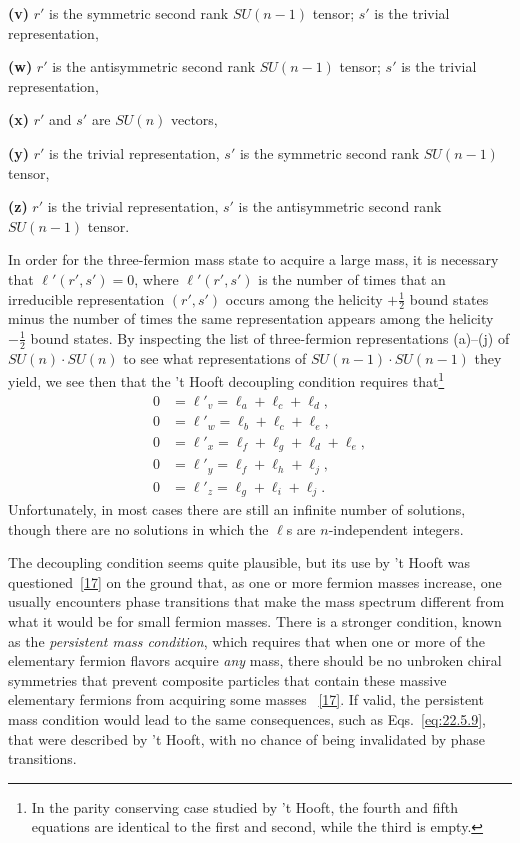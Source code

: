 \medskip
\noindent\textbf{(v)} $r'$ is the symmetric second rank $SU(n-1)$ tensor;
$s'$ is the trivial representation,

\noindent\textbf{(w)} $r'$ is the antisymmetric second rank $SU(n-1)$
tensor; $s'$ is the trivial representation,

\noindent\textbf{(x)} $r'$ and $s'$ are $SU(n)$ vectors,

\noindent\textbf{(y)} $r'$ is the trivial representation, $s'$ is the
symmetric second rank $SU(n-1)$ tensor,

\noindent\textbf{(z)} $r'$ is the trivial representation, $s'$ is the
antisymmetric second rank $SU(n-1)$ tensor.
\medskip

In order for the three-fermion mass state to acquire a large mass, it is
necessary that $\ell'(r',s')=0$, where $\ell'(r',s')$ is the number of
times that an irreducible representation $(r',s')$ occurs among the
helicity $+\frac12$ bound states minus the number of times the same
representation appears among the helicity $-\frac12$ bound states. By
inspecting the list of three-fermion representations (a)--(j) of
$SU(n)\cdot SU(n)$ to see what representations of
$SU(n-1)\cdot SU(n-1)$ they yield, we see then that the 't Hooft
decoupling condition requires that\footnote{In the parity conserving case
studied by 't Hooft, the fourth and fifth equations are identical to the
first and second, while the third is empty.}
\begin{equation}
 \begin{aligned}
 0&=\ell'_v=\ell_a+\ell_c+\ell_d,\\
 0&=\ell'_w=\ell_b+\ell_c+\ell_e,\\
 0&=\ell'_x=\ell_f+\ell_g+\ell_d+\ell_e,\\
 0&=\ell'_y=\ell_f+\ell_h+\ell_j,\\
 0&=\ell'_z=\ell_g+\ell_i+\ell_j.
 \end{aligned}
 \tag{22.5.9}\label{eq:22.5.9}
\end{equation}
Unfortunately, in most cases there are still an infinite number of
solutions, though there are no solutions in which the $\ell$s are
$n$-independent integers.

The decoupling condition seems quite plausible, but its use by 't Hooft was
questioned~\hyperref[ch22-ref-17]{[17]} on the ground that, as one or more
fermion masses increase, one usually encounters phase transitions that
make the mass spectrum different from what it would be for small fermion
masses. There is a stronger condition, known as the \emph{persistent mass
condition}, which requires that when one or more of the elementary fermion
flavors acquire \emph{any} mass, there should be no unbroken chiral
symmetries that prevent composite particles that contain these massive
elementary fermions from acquiring some masses~%
\hyperref[ch22-ref-17]{[17]}. If valid, the persistent mass condition would
lead to the same consequences, such as Eqs.~\eqref{eq:22.5.9}, that were
described by 't Hooft, with no chance of being invalidated by phase
transitions.

